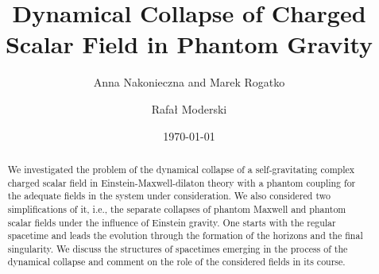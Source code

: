 \documentclass[aps,showpacs,nofootinbib,floatfix]{revtex4}
\begin{document}
\title{Dynamical Collapse of Charged Scalar Field in Phantom Gravity}




\author{Anna Nakonieczna and Marek Rogatko}

\author{ Rafa{\l} Moderski}


\date{\today}



\begin{abstract}
We investigated the problem of the dynamical collapse of a self-gravitating complex charged scalar field
in Einstein-Maxwell-dilaton theory with a phantom coupling for the adequate fields in the system under consideration.
We also considered two simplifications of it, i.e., the separate collapses of phantom Maxwell and phantom scalar fields 
under the influence of Einstein gravity.
One starts with the regular spacetime and leads the evolution through the formation of the horizons and the 
final singularity. We discuss the structures of spacetimes emerging in the process of the dynamical collapse 
and comment on the role of the considered fields in its course.

\end{abstract}
\end{document}
